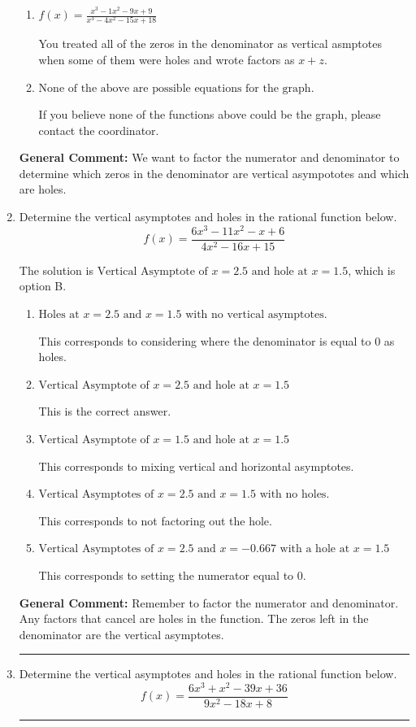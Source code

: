 \documentclass{extbook}[14pt]
\newcommand{\litem}[1]{\item #1

\rule{\textwidth}{0.4pt}}
\begin{document}
\begin{enumerate}
{\begin{enumerate}[label=\Alph*.]
This is the correct answer!
\item \( f(x)=\frac{x^{3} -1 x^{2} -9 x + 9}{x^{3} -4 x^{2} -15 x + 18} \)

You treated all of the zeros in the denominator as vertical asmptotes when some of them were holes and wrote factors as $x+z$.
\item \( \text{None of the above are possible equations for the graph.} \)

If you believe none of the functions above could be the graph, please contact the coordinator.
\end{enumerate}

\textbf{General Comment:} We want to factor the numerator and denominator to determine which zeros in the denominator are vertical asympototes and which are holes.
}
\litem{
Determine the vertical asymptotes and holes in the rational function below.
\[ f(x) = \frac{6x^{3} -11 x^{2} -x + 6}{4x^{2} -16 x + 15} \]

The solution is \( \text{Vertical Asymptote of } x = 2.5 \text{ and hole at } x = 1.5 \), which is option B.\begin{enumerate}[label=\Alph*.]
\item \( \text{Holes at } x = 2.5 \text{ and } x = 1.5 \text{ with no vertical asymptotes.} \)

This corresponds to considering where the denominator is equal to 0 as holes.
\item \( \text{Vertical Asymptote of } x = 2.5 \text{ and hole at } x = 1.5 \)

This is the correct answer.
\item \( \text{Vertical Asymptote of } x = 1.5 \text{ and hole at } x = 1.5 \)

This corresponds to mixing vertical and horizontal asymptotes.
\item \( \text{Vertical Asymptotes of } x = 2.5 \text{ and } x = 1.5 \text{ with no holes.} \)

This corresponds to not factoring out the hole.
\item \( \text{Vertical Asymptotes of } x = 2.5 \text{ and } x = -0.667 \text{ with a hole at } x = 1.5 \)

This corresponds to setting the numerator equal to 0.
\end{enumerate}

\textbf{General Comment:} Remember to factor the numerator and denominator. Any factors that cancel are holes in the function. The zeros left in the denominator are the vertical asymptotes.
}
\litem{
Determine the vertical asymptotes and holes in the rational function below.
\[ f(x) = \frac{6x^{3} + x^{2} -39 x + 36}{9x^{2} -18 x + 8} \]

}
\end{enumerate}
\end{document}
